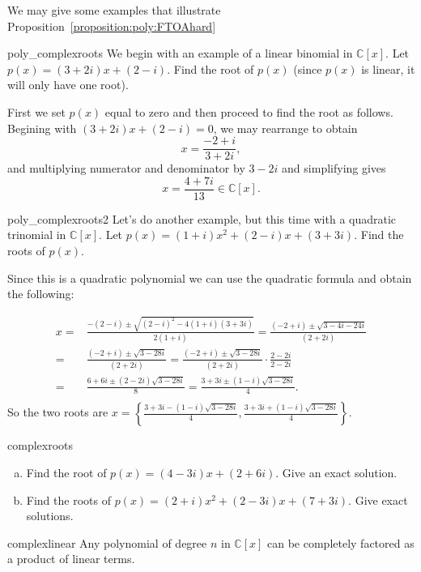 We may give some examples that illustrate Proposition~\ref{proposition:poly:FTOAhard} 

\begin{example}{poly_complexroots} 
We begin with an example of a linear binomial in $\mathbb{C}[x]$. 
Let $p(x)=(3+2i)x+(2-i)$. Find the root of $p(x)$ (since $p(x)$ is linear, it will only have one root).

First we set $p(x)$ equal to zero and then proceed to find the root as follows. Begining with
$(3+2i)x+(2-i)=0$, we may rearrange to obtain
$$x=\frac{-2+i}{3+2i},$$
and multiplying numerator and denominator by $3 - 2i$ and simplifying gives
$$x=\frac{4+7i}{13}\in \mathbb{C}[x].$$
\end{example}

\begin{example}{poly_complexroots2} 
Let's do another example, but this time with a quadratic trinomial in $\mathbb{C}[x]$. 
Let $p(x)=(1+i)x^2+(2-i)x+(3+3i)$. Find the roots of $p(x)$.

Since this is a quadratic polynomial we can use the quadratic formula and obtain the following:

\begin{align*}
x=&\frac {-(2-i) \pm \sqrt{(2-i)^2-4(1+i)(3+3i)}}{2(1+i)}=\frac {(-2+i) \pm \sqrt{3-4i-24i}}{(2+2i)}\\
=&\frac {(-2+i) \pm \sqrt{3-28i}}{(2+2i)}=\frac {(-2+i) \pm \sqrt{3-28i}}{(2+2i)}\cdot \frac {2-2i}{2-2i}\\
=&\frac{6+6i\pm (2-2i)\sqrt{3-28i}}{8}=\frac{3+3i\pm (1-i)\sqrt{3-28i}}{4}.\\
\end{align*}
So the two roots are $x=\left\{\frac{3+3i- (1-i)\sqrt{3-28i}}{4}, \frac{3+3i+ (1-i)\sqrt{3-28i}}{4}\right\}$.
\end{example}

\begin{exercise}{complexroots}
\begin {enumerate}[(a)]
\item
Find the root of $p(x)=(4-3i)x+(2+6i)$. Give an exact solution.
\item
Find the roots of $p(x)=(2+i)x^2+(2-3i)x+(7+3i)$. Give exact solutions. 
\end{enumerate}
\end{exercise}

\begin{prop}{complexlinear}
Any polynomial of degree $n$ in $\mathbb{C}[x]$ can be completely factored as a product of linear terms.
\end{prop}

